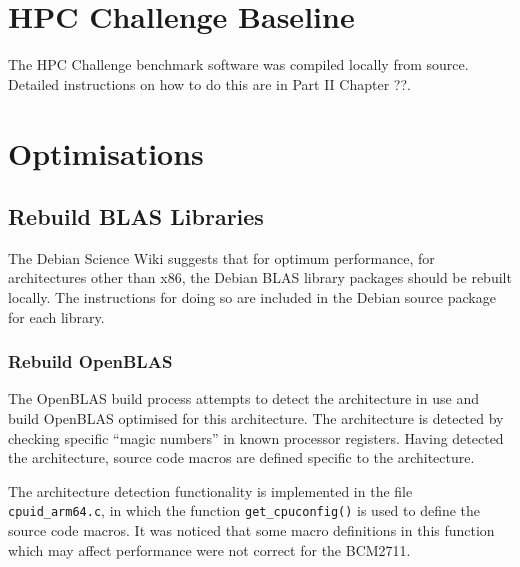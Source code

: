\documentclass{report}
\begin{document}
%
%
\section{HPC Challenge Baseline}

The HPC Challenge benchmark software was compiled locally from source. Detailed instructions on how to do this are in Part II Chapter ??.

















%
%
\section{Optimisations}


%
%
\subsection{Rebuild BLAS Libraries}

The Debian Science Wiki suggests that for optimum performance, for architectures other than x86, the Debian BLAS library packages should be rebuilt locally. The instructions for doing so are included in the Debian source package for each library.


%
%
\subsubsection{Rebuild OpenBLAS}
The OpenBLAS build process attempts to detect the architecture in use and build OpenBLAS optimised for this architecture. The architecture is detected by checking specific ``magic numbers'' in known processor registers. Having detected the architecture, source code macros are defined specific to the architecture. 

The architecture detection functionality is implemented in the file \verb|cpuid_arm64.c|, in which the function \verb|get_cpuconfig()| is used to define the source code macros. It was noticed that some macro definitions in this function which may affect performance were not correct for the BCM2711.
\end{document}
